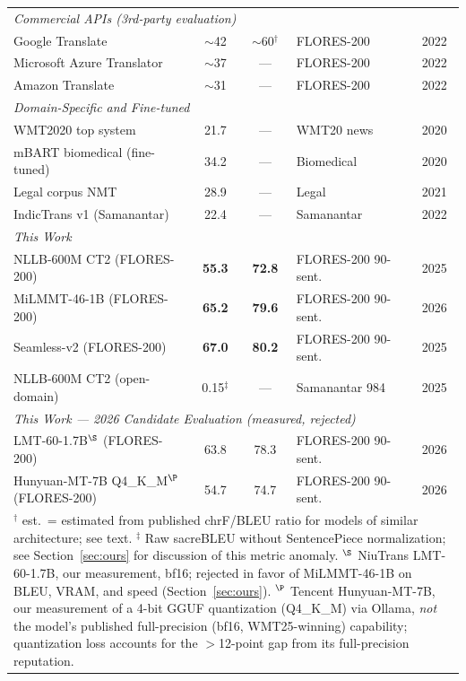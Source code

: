\documentclass[conference]{IEEEtran}
\begin{document}
\begin{table}[t]
\begin{tabular}{p{3.4cm} c c p{1.7cm} c}
    \midrule
    \multicolumn{5}{l}{\textit{Commercial APIs (3rd-party evaluation)}} \\
    Google Translate~\cite{nllb2022}             & $\sim$42 & $\sim$60$^\dagger$ & FLORES-200  & 2022 \\
    Microsoft Azure Translator~\cite{nllb2022}   & $\sim$37 & ---                & FLORES-200  & 2022 \\
    Amazon Translate~\cite{nllb2022}             & $\sim$31 & ---                & FLORES-200  & 2022 \\
    \midrule
    \multicolumn{5}{l}{\textit{Domain-Specific and Fine-tuned}} \\
    WMT2020 top system~\cite{barrault2020wmt}    & 21.7  & ---  & WMT20 news  & 2020 \\
    mBART biomedical (fine-tuned)~\cite{hasan2020low} & 34.2 & --- & Biomedical & 2020 \\
    Legal corpus NMT~\cite{alam2021bengali}      & 28.9  & ---  & Legal       & 2021 \\
    IndicTrans v1 (Samanantar)~\cite{ramesh2022samanantar} & 22.4 & --- & Samanantar & 2022 \\
    \midrule
    \multicolumn{5}{l}{\textit{This Work}} \\
    NLLB-600M CT2 (FLORES-200)~\cite{biswas2025bnentr}  & \textbf{55.3} & \textbf{72.8} & FLORES-200 90-sent. & 2025 \\
    MiLMMT-46-1B (FLORES-200)~\cite{biswas2025bnentr}   & \textbf{65.2} & \textbf{79.6} & FLORES-200 90-sent. & 2026 \\
    Seamless-v2 (FLORES-200)~\cite{biswas2025bnentr}    & \textbf{67.0} & \textbf{80.2} & FLORES-200 90-sent. & 2025 \\
    NLLB-600M CT2 (open-domain)~\cite{biswas2025bnentr} & 0.15$^\ddagger$ & --- & Samanantar 984 & 2025 \\
    \midrule
    \multicolumn{5}{l}{\textit{This Work --- 2026 Candidate Evaluation (measured, rejected)}} \\
    LMT-60-1.7B$^\S$ (FLORES-200)~\cite{biswas2025bnentr}      & 63.8 & 78.3 & FLORES-200 90-sent. & 2026 \\
    Hunyuan-MT-7B Q4\_K\_M$^\P$ (FLORES-200)~\cite{biswas2025bnentr} & 54.7 & 74.7 & FLORES-200 90-sent. & 2026 \\
    \bottomrule
    \multicolumn{5}{p{13cm}}{\scriptsize
      $^\dagger$ est.\ = estimated from published chrF/BLEU ratio for models of
      similar architecture; see text.
      $^\ddagger$ Raw sacreBLEU without SentencePiece normalization; see
      Section~\ref{sec:ours} for discussion of this metric anomaly.
      $^\S$ NiuTrans LMT-60-1.7B, our measurement, bf16; rejected in favor of
      MiLMMT-46-1B on BLEU, VRAM, and speed (Section~\ref{sec:ours}).
      $^\P$ Tencent Hunyuan-MT-7B, our measurement of a 4-bit GGUF quantization
      (Q4\_K\_M) via Ollama, \emph{not} the model's published full-precision
      (bf16, WMT25-winning) capability; quantization loss accounts for the
      $>$12-point gap from its full-precision reputation.}
  \end{tabular}
\end{table}
\end{document}
